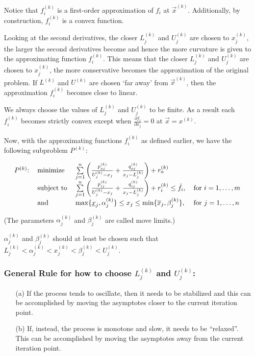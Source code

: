 Notice that $f_i^{(k)}$ is a first-order approximation of $f_i$ at $\vec{x}^{(k)}$. Additionally, by construction, $f_i^{(k)}$ is a {\color{tiananmen}convex function}.

Looking at the second derivatives, the closer $L_j^{(k)}$ and $U_j^{(k)}$ are chosen to $x_j^{(k)}$, the larger the second derivatives become and hence the more curvature is given to the approximating function $f_i^{(k)}$. This means that the closer $L_j^{(k)}$ and $U_j^{(k)}$ are chosen to $x_j^{(k)}$, the more conservative becomes the approximation of the original problem. If $L^{(k)}$ and $U^{(k)}$ are chosen `far away' from $\vec{x}^{(k)}$, then the approximation $f_i^{(k)}$ becomes close to linear.

We always choose the values of $L_j^{(k)}$ and $U_j^{(k)}$ to be finite. As a result each $f_i^{(k)}$ becomes strictly convex except when $\frac{\partial f_i}{\partial x_j}=0$ at $\vec{x}=x^{(k)}$.

Now, with the approximating functions $f_i^{(k)}$ as defined earlier, we have the following subproblem $P^{(k)}$:

{\color{baystate}
	\begin{equation}
		\begin{tabular}{llll}
			$P^{(k)}$: & minimize & $\sum\limits_{j=1}^{n}\left(\frac{p_{oj}^{(k)}}{U_j^{(k)}-x_j}+\frac{q_{oj}^{(k)}}{x_j-L_j^{(k)}}\right)+r_o^{(k)}$ &  \\
			& subject to & $\sum\limits_{j=1}^{n}\left(\frac{p_{ij}^{(k)}}{U_j^{(k)}-x_j}+\frac{q_{ij}^{(k)}}{x_j-L_j^{(k)}}\right)+r_i^{(k)}\leq\hat{f}_i$, & for $i=1,\ldots,m$ \\
			& and & $\max\lbrace\underline{x}_j,\alpha_j^{(k)}\rbrace\leq x_j\leq \min\lbrace \overline{x}_j,\beta_j^{(k)}\rbrace$, & for $j=1,\ldots,n$
		\end{tabular}
	\end{equation}
}

(The parameters $\alpha_j^{(k)}$ and $\beta_j^{(k)}$ are called {\color{tiananmen}move limits}.)

$\alpha_j^{(k)}$ and $\beta_j^{(k)}$ should at least be chosen such that $L_j^{(k)}<\alpha_j^{(k)}<x_j^{(k)}<\beta_j^{(k)}<U_j^{(k)}$.

\subsubsection*{General Rule for how to choose $L_j^{(k)}$ and $U_j^{(k)}$:}
\begin{itemize}
	\item[(a)] If the process tends to oscillate, then it needs to be stabilized and this can be accomplished by moving the asymptotes closer to the current iteration point.
	\item[(b)] If, instead, the process is monotone and slow, it needs to be ``relaxed''. This can be accomplished by moving the asymptotes away from the current iteration point.
\end{itemize}

